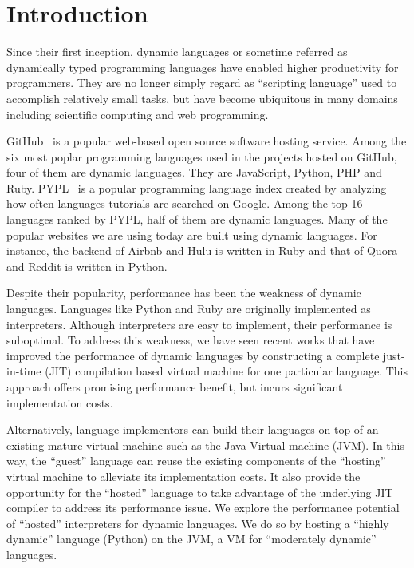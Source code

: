 \chapter{Introduction}
\label{chp:ch1-intro}

Since their first inception, dynamic languages or sometime referred as dynamically typed programming languages have enabled higher productivity for programmers.
They are no longer simply regard as ``scripting language'' used to accomplish relatively small tasks,
but have become ubiquitous in many domains including scientific computing and web programming.

GitHub~\cite{github} is a popular web-based open source software hosting service.
Among the six most poplar programming languages used in the projects hosted on GitHub, four of them are dynamic languages.
They are JavaScript, Python, PHP and Ruby.
PYPL~\cite{pypl} is a popular programming language index created by analyzing how often languages tutorials are searched on Google.
Among the top 16 languages ranked by PYPL, half of them are dynamic languages.
Many of the popular websites we are using today are built using dynamic languages.
For instance, the backend of Airbnb and Hulu is written in Ruby and that of Quora and Reddit is written in Python.

Despite their popularity, performance has been the weakness of dynamic languages.
Languages like Python and Ruby are originally implemented as interpreters.
Although interpreters are easy to implement, their performance is suboptimal.
To address this weakness, we have seen recent works that have improved the performance of dynamic languages
by constructing a complete just-in-time (JIT) compilation based virtual machine for one particular language.
This approach offers promising performance benefit, but incurs significant implementation costs.

Alternatively, language implementors can build their languages on top of an existing mature virtual machine such as the Java Virtual machine (JVM).
In this way, the ``guest'' language can reuse the existing components of the ``hosting'' virtual machine to alleviate its implementation costs.
It also provide the opportunity for the ``hosted'' language to take advantage of the underlying JIT compiler to address its performance issue.
We explore the performance potential of ``hosted'' interpreters for dynamic languages.
We do so by hosting a ``highly dynamic'' language (Python) on the JVM, a VM for ``moderately dynamic'' languages.

